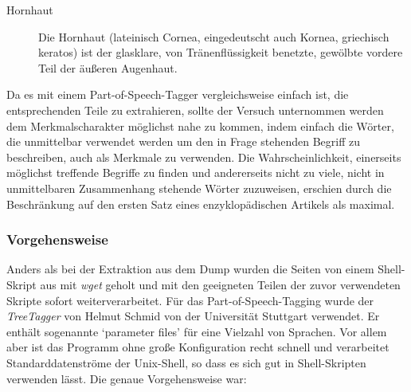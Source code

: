 \documentclass[pagesize,DIV=calc,12pt,draft]{scrreprt}
\begin{document}
\begin{description}
\item[Hornhaut]
Die Hornhaut (lateinisch Cornea, eingedeutscht auch Kornea, griechisch keratos) ist der glasklare, von Tränenflüssigkeit benetzte, gewölbte vordere Teil der äußeren Augenhaut. 
\end{description}

Da es mit einem Part-of-Speech-Tagger vergleichsweise einfach ist, die entsprechenden Teile zu extrahieren, sollte der Versuch unternommen werden dem Merkmalscharakter möglichst nahe zu kommen, indem einfach die Wörter, die unmittelbar verwendet werden um den in Frage stehenden Begriff zu beschreiben, auch als Merkmale zu verwenden. 
Die Wahrscheinlichkeit, einerseits möglichst treffende Begriffe zu finden und andererseits nicht zu viele, nicht in unmittelbaren Zusammenhang stehende Wörter zuzuweisen, erschien durch die Beschränkung auf den ersten Satz eines enzyklopädischen Artikels als maximal. 

\subsubsection{Vorgehensweise}

Anders als bei der Extraktion aus dem Dump wurden die Seiten von einem Shell-Skript aus mit \emph{wget} geholt und mit den geeigneten Teilen der zuvor verwendeten Skripte sofort weiterverarbeitet. 
Für das Part-of-Speech-Tagging wurde der \emph{TreeTagger} von Helmut Schmid von der Universität Stuttgart verwendet. 
Er enthält sogenannte `parameter files' für eine Vielzahl von Sprachen. 
Vor allem aber ist das Programm ohne große Konfiguration recht schnell und verarbeitet Standarddatenströme der Unix-Shell, so dass es sich gut in Shell-Skripten verwenden lässt. 
Die genaue Vorgehensweise war: 
\end{document}
